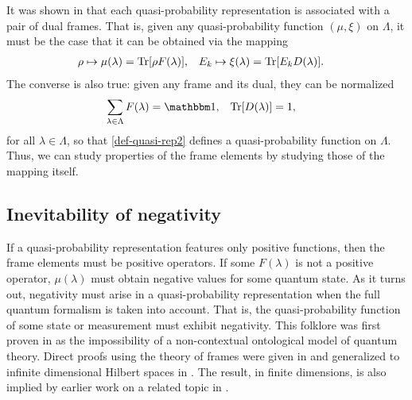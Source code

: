 It was shown in \cite{ferrie_frame_2008,ferrie_framed_2009,ferrie_necessity_2010} that each quasi-probability representation is associated with a pair of dual frames.  That is, given any quasi-probability function $(\mu,\xi)$ on $\Lambda$, it must be the case that it can be obtained via the mapping
\begin{align}\label{def-quasi-rep2}
\rho &\mapsto \mu(\lambda) = \Tr[\rho F(\lambda)], & E_k &\mapsto \xi(\lambda) = \Tr [E_k D(\lambda)].
\end{align}
The converse is also true: given any frame and its dual, they can be normalized
\begin{align}\label{def-quasi-rep-frame}
\sum_{\lambda \in \Lambda} F(\lambda) &= \id, & \Tr[D(\lambda)] &= 1,
\end{align}
for all $\lambda \in \Lambda$, so that \ref{def-quasi-rep2} defines a quasi-probability function on $\Lambda$. Thus, we can study properties of the frame elements by studying those of the mapping itself.

\subsection{Inevitability of negativity}

If a quasi-probability representation features only positive functions, then the frame elements must be positive operators.  If some $F(\lambda)$ is not a positive operator, $\mu(\lambda)$ must obtain negative values for some quantum state. As it turns out, negativity must arise in a quasi-probability representation when the full quantum formalism is taken into account. That is, the quasi-probability function of some state or measurement must exhibit negativity. This folklore was first proven in \cite{spekkens_negativity_2008} as the impossibility of a non-contextual ontological model of quantum theory. Direct proofs using the theory of
frames were given in  \cite{ferrie_frame_2008,ferrie_framed_2009} and
generalized to infinite dimensional Hilbert spaces in \cite
{ferrie_necessity_2010}. The result, in finite dimensions, is also implied by earlier work on a related topic in \cite{busch_classical_1993}.

